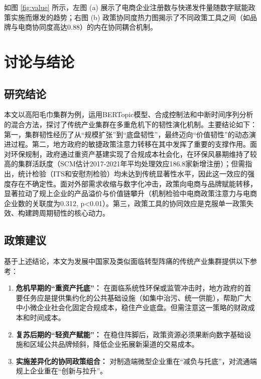 \documentclass[12pt,a4paper]{ctexart}
\begin{document}
如图 \ref{fig:value} 所示，左图 (a) 展示了电商企业注册数与快递发件量随数字赋能政策实施而爆发的趋势；右图 (b) 政策协同度热力图揭示了不同政策工具之间（如品牌与电商协同度高达0.88）的内在协同耦合机制。

\section{讨论与结论}
\label{sec:discussion}

\subsection{研究结论}
本文以高阳毛巾集群为例，运用BERTopic模型、合成控制法和中断时间序列分析的混合方法，探讨了传统产业集群在多重危机下的韧性演化机制。主要结论如下：第一，集群韧性经历了从\textquotedblleft 规模扩张\textquotedblright 到\textquotedblleft 底盘韧性\textquotedblright，最终迈向\textquotedblleft 价值韧性\textquotedblright 的动态演进过程。第二，地方政府的敏捷政策注意力转移在其中发挥了重要的支撑作用。面对环保规制，政府通过重资产基建实现了合规成本社会化，在环保风暴期维持了较高的集群活跃度（SCM估计2017-2021年平均处理效应186.8家新增注册）；但需指出，统计检验（ITS和安慰剂检验）均未达到传统显著性水平，因此这一效应的强度存在不确定性。面对外部需求收缩与数字化冲击，政策向电商与品牌赋能转移，显著拉动了规上企业的产品溢价与价值链攀升（机制检验中电商政策注意力与电商企业数的关联度为0.312, p<0.01）。第三，政策工具的协同效应是克服单一政策失效、构建跨周期韧性的核心动力。

\subsection{政策建议}
基于上述结论，本文为发展中国家及类似面临转型阵痛的传统产业集群提供以下参考：
\begin{enumerate}
    \item \textbf{危机早期的\textquotedblleft 重资产托底\textquotedblright：} 在面临系统性环保或监管冲击时，地方政府的首要任务应是提供集约化的公共基础设施（如集中治污、统一供能），帮助广大中小微企业社会化固定合规成本，稳住产业底盘。但需注意这一策略的财政成本和时间成本。
    \item \textbf{复苏后期的\textquotedblleft 轻资产赋能\textquotedblright：} 在稳住阵脚后，政策资源必须果断向数字基础设施和区域公共品牌倾斜，降低企业拓展新渠道的交易成本。
    \item \textbf{实施差异化的协同政策组合：} 对制造端微型企业重在\textquotedblleft 减负与托底\textquotedblright，对流通端规上企业重在\textquotedblleft 创新与拉升\textquotedblright。
\end{enumerate}
\end{document}
